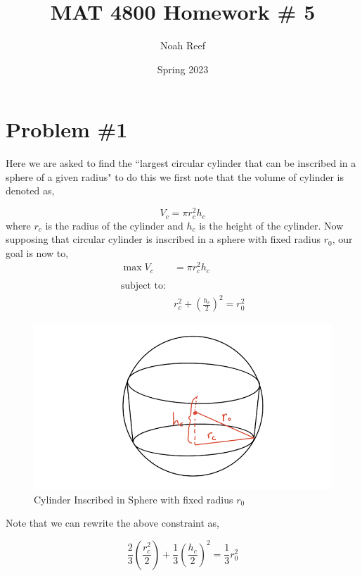 \documentclass{article}
\title{MAT 4800 Homework \# 5 }
\author{Noah Reef }
\date{Spring 2023}
\begin{document}
\maketitle

\section*{Problem \#1}
Here we are asked to find the ``largest circular cylinder that can be inscribed in a sphere of a given radius" to do this we first note that the volume of cylinder is denoted as,

\begin{equation*}
    V_{c} = \pi r_c^2h_c
\end{equation*}
where $r_c$ is the radius of the cylinder and $h_c$ is the height of the cylinder. Now supposing that circular cylinder is inscribed in a sphere with fixed radius $r_0$, our goal is now to,
\begin{align*}
    \max{V_c} &=\pi r_c^2 h_c\\ \\
    \text{subject to:}\\
    &r_c^2 + \left(\frac{h_c}{2}\right)^2 = r_0^2 
\end{align*}


\begin{figure}[H]
    \centering
    \includegraphics[scale=0.6]{Screenshot 2023-03-08 at 5.22.19 PM.png}
    \caption{Cylinder Inscribed in Sphere with fixed radius $r_0$}
    \label{fig:my_label}
\end{figure}

Note that we can rewrite the above constraint as,

\begin{equation*}
    \frac{2}{3}\left(\frac{r_c^2}{2}\right) + \frac{1}{3}\left(\frac{h_c}{2}\right)^2 = \frac{1}{3}r_0^2 
\end{equation*}
\end{document}
